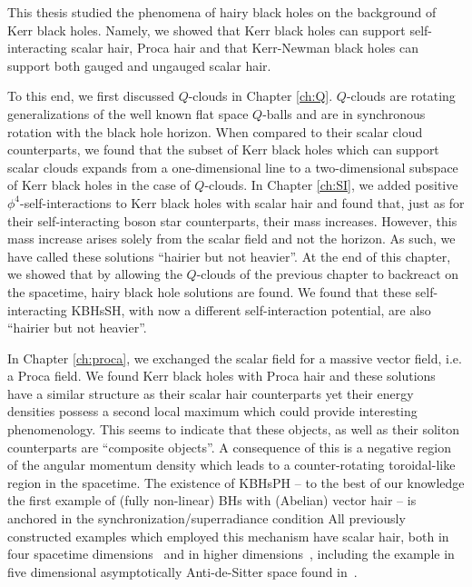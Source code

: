 This thesis studied the phenomena of hairy black holes on the background of Kerr black holes.
Namely, we showed that Kerr black holes can support self-interacting scalar hair, Proca hair and that Kerr-Newman black holes can support both gauged and ungauged scalar hair.

To this end, we first discussed $Q$-clouds in Chapter \ref{ch:Q}.
$Q$-clouds are rotating generalizations of the well known flat space $Q$-balls and are in synchronous rotation with the black hole horizon.
When compared to their scalar cloud counterparts, we found that the subset of Kerr black holes which can support scalar clouds expands from a one-dimensional line to a two-dimensional subspace of Kerr black holes in the case of $Q$-clouds.
In Chapter \ref{ch:SI}, we added positive $\phi^4$-self-interactions to Kerr black holes with scalar hair and found that, just as for their self-interacting boson star counterparts, their mass increases.
However, this mass increase arises solely from the scalar field and not the horizon.
As such, we have called these solutions ``hairier but not heavier''.
At the end of this chapter, we showed that by allowing the $Q$-clouds of the previous chapter to backreact on the spacetime, hairy black hole solutions are found.
We found that these self-interacting KBHsSH, with now a different self-interaction potential, are also ``hairier but not heavier''.

\bigskip

In Chapter \ref{ch:proca}, we exchanged the scalar field for a massive vector field, i.e. a Proca field.
We found Kerr black holes with Proca hair and these solutions have a similar structure as their scalar hair counterparts yet their energy densities possess a second local maximum which could provide interesting phenomenology.
This seems to indicate that these objects, as well as their soliton counterparts are ``composite objects''.
A consequence of this is a negative region of the angular momentum density which leads to a counter-rotating toroidal-like region in the spacetime.
The existence of KBHsPH -- to the best of our knowledge the first example of (fully non-linear)   
BHs with (Abelian) vector hair -- is anchored  in the synchronization/superradiance condition
%
All previously constructed examples which employed this mechanism have scalar hair, 
both in four spacetime dimensions~\cite{Herdeiro:2014goa,Herdeiro:2015gia,Kleihaus:2015iea,Herdeiro:2015tia} and in higher dimensions~\cite{Brihaye:2014nba,Herdeiro:2015kha}, 
including the example in five dimensional asymptotically Anti-de-Sitter space found in~\cite{Dias:2011at}. 

